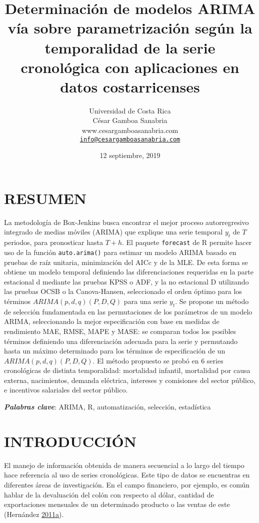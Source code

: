 \documentclass[]{article}
\title{Determinación de modelos ARIMA vía sobre parametrización según la
temporalidad de la serie cronológica con aplicaciones en datos
costarricenses}
\author{Universidad de Costa Rica\\
César Gamboa Sanabria\\
www.cesargamboasanabria.com\\
\href{mailto:info@cesargamboasanabria.com}{\nolinkurl{info@cesargamboasanabria.com}}}
\date{12 septiembre, 2019}
\begin{document}
\maketitle

\newpage

\section*{RESUMEN}

La metodología de Box-Jenkins busca encontrar el mejor proceso
autorregresivo integrado de medias móviles (ARIMA) que explique una
serie temporal \(y_t\) de \(T\) periodos, para pronosticar hasta
\(T+h\). El paquete \texttt{forecast} de R permite hacer uso de la
función \texttt{auto.arima()} para estimar un modelo ARIMA basado en
pruebas de raíz unitaria, minimización del AICc y de la MLE. De esta
forma se obtiene un modelo temporal definiendo las diferenciaciones
requeridas en la parte estacional d mediante las pruebas KPSS o ADF, y
la no estacional D utilizando las pruebas OCSB o la Canova-Hansen,
seleccionado el orden óptimo para los términos \(ARIMA(p,d,q)(P,D,Q)\)
para una serie \(y_t\). Se propone un método de selección fundamentada
en las permutaciones de los parámetros de un modelo ARIMA, seleccionando
la mejor especificación con base en medidas de rendimiento MAE, RMSE,
MAPE y MASE: se comparan todos los posibles términos definiendo una
diferenciación adecuada para la serie y permutando hasta un máximo
determinado para los términos de especificación de un
\(ARIMA(p,d,q)(P,D,Q)\). El método propuesto se probó en 6 series
cronológicas de distinta temporalidad: mortalidad infantil, mortalidad
por causa externa, nacimientos, demanda eléctrica, intereses y
comisiones del sector público, e incentivos salariales del sector
público.

\textbf{\emph{Palabras clave}}: ARIMA, R, automatización, selección,
estadística

\newpage

\tableofcontents

\newpage

\section{INTRODUCCIÓN}

El manejo de información obtenida de manera secuencial a lo largo del
tiempo hace referencia al uso de series cronológicas. Este tipo de datos
se encuentras en diferentes áreas de investigación. En el campo
financiero, por ejemplo, es común hablar de la devaluación del colón con
respecto al dólar, cantidad de exportaciones mensuales de un determinado
producto o las ventas de este (Hernández
\protect\hyperlink{ref-oscarh-1}{2011}\protect\hyperlink{ref-oscarh-1}{a}).
\end{document}
